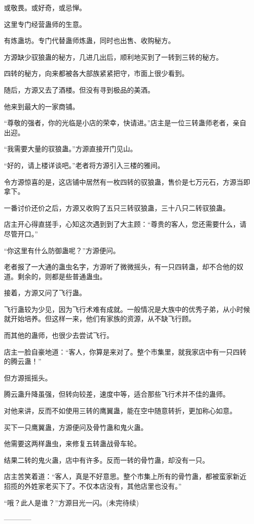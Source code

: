 \begin{this_body}
或敬畏。或好奇，或忌惮。

这里专门经营蛊师的生意。

有炼蛊坊。专门代替蛊师炼蛊，同时也出售、收购秘方。

方源缺少驭狼蛊的秘方，几进几出后，顺利地买到了一转到三转的秘方。

四转的秘方，向来都被各大部族紧紧把守，市面上很少看到。

随后，方源又去了酒楼。但没有寻到极品的美酒。

他来到最大的一家商铺。

“尊敬的强者，你的光临是小店的荣幸，快请进。”店主是一位三转蛊师老者，亲自出迎。

“我需要大量的驭狼蛊。”方源直接开门见山。

“好的，请上楼详谈吧。”老者将方源引入三楼的雅间。

令方源惊喜的是，这店铺中居然有一枚四转的驭狼蛊，售价是七万元石，方源当即拿下。

一番讨价还价之后，方源又收购了五只三转驭狼蛊，三十八只二转驭狼蛊。

店主开心得直搓手，心知这次遇到到了大主顾：“尊贵的客人，您还需要什么，请尽管开口。”

“你这里有什么防御蛊呢？”方源便问。

老者报了一大通的蛊虫名字，方源听了微微摇头，有一只四转蛊，却不合他的奴道。剩余的，则都是些普通蛊虫。

接着，方源又问了飞行蛊。

飞行蛊较为少见，因为飞行术难有成就。一般情况是大族中的优秀子弟，从小时候就开始培养。但这样一来，他们有家族的资源，从不缺飞行顾。

而其他的蛊师，也很少去尝试飞行。

店主一脸自豪地道：“客人，你算是来对了。整个市集里，就我家店中有一只四转的腾云蛊！”

但方源摇摇头。

腾云蛊升降虽强，但转向较差，速度中等，适合那些飞行术并不佳的蛊师。

对他来讲，反而不如使用三转的鹰翼蛊，能在空中随意转折，更加称心如意。

买下一只鹰翼蛊，方源便问及骨竹蛊和鬼火蛊。

他需要这两样蛊虫，来修复五转蛊战骨车轮。

结果二转的鬼火蛊，店中有许多。反而一转的骨竹蛊，却没有一只。

店主苦笑着道：“客人，真是不好意思。整个市集上所有的骨竹蛊，都被蛮家新近招揽的外姓家老买下了。不仅本店没有，其他店里也没有。”

“哦？此人是谁？”方源目光一闪。(未完待续)

------------

\end{this_body}

